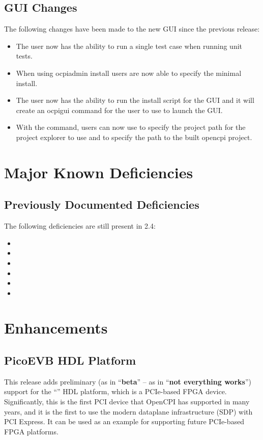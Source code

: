 \subsection{GUI Changes}
\label{sec:24_ie_gui}
The following changes have been made to the new GUI since the previous release:
\begin{itemize}
\setlength\itemsep{0em} %
\item The user now has the ability to run a single test case when running unit tests.
\item When using ocpiadmin install users are now able to specify the minimal install.
\item The user now has the ability to run the install script for the GUI and it will create an ocpigui command for the user to use to launch the GUI.
\item With the  command, users can now use  to specify the project path for the project explorer to use and
 to specify the path to the built opencpi project.
\end{itemize}

\section{Major Known Deficiencies}
\label{sec:24_bugs}

\subsection{Previously Documented Deficiencies}
The following deficiencies are still present in 2.4:
\begin{itemize}
\setlength\itemsep{0em} %
\item {}
\item {}
\item {}
\item {}
\item {}
\item {}
\end{itemize}


\def\ocpiversion{v2.3.0}
\section{Enhancements}

\subsection{PicoEVB HDL Platform}
\label{sec:23_picoevb}
This release adds preliminary (as in ``\textbf{beta}'' -- as in ``\textbf{not everything works}'') support for the ``'' HDL platform, which is a PCIe-based FPGA device.  Significantly, this is the first PCI device that OpenCPI has supported in many years, and it is the first to use the modern dataplane infrastructure (SDP) with PCI Express.  It can be used as an example for supporting future PCIe-based FPGA platforms.\\

